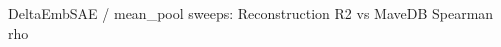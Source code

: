\documentclass{article}
\begin{document}
\fontsize{13.0}{16.25}%
\ifdefined\psfrag\else\hbox{}\fi%
{\rmfamily DeltaEmbSAE / mean\_pool sweeps: Reconstruction R2 vs MaveDB Spearman rho}%
\end{document}
